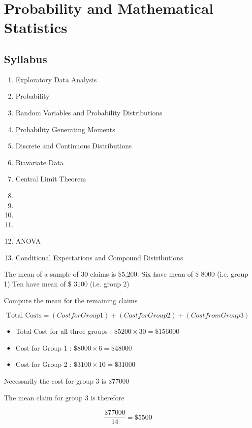 \section{Probability and Mathematical Statistics}
\subsection*{Syllabus}

\begin{enumerate}	
\item	Exploratory Data Analysis
\item	Probability
\item	Random Variables and Probability Distributions
\item	Probability Generating Moments
\item	Discrete and Continuous Distributions
\item	Biavariate Data
\item	Central Limit Theorem
\item	
\item	
\item	
\item	
\item	ANOVA
\item	Conditional Expectations and Compound Distributions
\end{enumerate}	

The mean of a sample of 30 claims is \$5,200.
Six have mean of \$ 8000 (i.e. group 1)
Ten have mean of \$ 3100 (i.e. group 2)

Compute the mean for the remaining claims

\[\mbox{Total Costs} = (Cost for Group 1) + (Cost for Group 2) + (Cost from Group 3)\]

\begin{itemize}
\item Total Cost for all three groups : $\$5200 \times 30 = \$156000$
\item Cost for Group 1 : $\$8000 \times 6 = \$48000$
\item Cost for Group 2 : $\$3100 \times 10 = \$31000$
\end{itemize}

Necessarily the cost for group 3 is $\$77000$

The mean claim for group 3 is therefore

\[ \frac{\$77000}{14} = \$5500 \]

